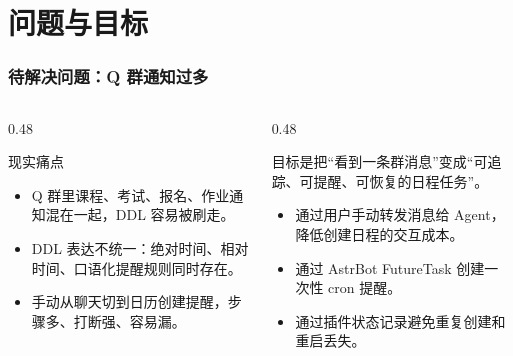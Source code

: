 \frame{\titlepage}

\section{问题与目标}

\begin{frame}
  \frametitle{待解决问题：Q 群通知过多}
  \begin{columns}[T]
    \begin{column}{0.48\textwidth}
      \begin{block}{现实痛点}
        \begin{itemize}
          \item Q 群里课程、考试、报名、作业通知混在一起，DDL 容易被刷走。
          \item DDL 表达不统一：绝对时间、相对时间、口语化提醒规则同时存在。
          \item 手动从聊天切到日历创建提醒，步骤多、打断强、容易漏。
        \end{itemize}
      \end{block}
    \end{column}
    \begin{column}{0.48\textwidth}
      \begin{noteBlock}
        目标是把“看到一条群消息”变成“可追踪、可提醒、可恢复的日程任务”。
      \end{noteBlock}
      \vspace{0.25cm}
      \begin{itemize}
        \item 通过用户手动转发消息给 Agent，降低创建日程的交互成本。
        \item 通过 AstrBot FutureTask 创建一次性 cron 提醒。
        \item 通过插件状态记录避免重复创建和重启丢失。
      \end{itemize}
    \end{column}
  \end{columns}
\end{frame}

